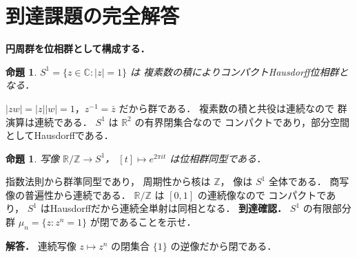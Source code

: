 \documentclass[a5paper,10pt,onecolumn]{jsarticle}
\makeatletter
\theoremstyle{mathnotetheorem}
\newtheorem{proposition}[theorem]{命題}
\renewcommand{\proofname}{証明}
\renewenvironment{proof}[1][\proofname]{%
  \par\pushQED{\qed}\normalfont\topsep4\p@\@plus2\p@\relax
  \trivlist\item[\hskip\labelsep\bfseries #1]\ignorespaces
}{\popQED\endtrivlist\@endpefalse}
\makeatother
\begin{document}
\section{到達課題の完全解答}
\noindent\textbf{円周群を位相群として構成する．}
\begin{proposition}
$S^1=\{z\in\mathbb C:|z|=1\}$ は
複素数の積によりコンパクトHausdorff位相群となる．
\end{proposition}
\begin{proof}
$|zw|=|z||w|=1$，$z^{-1}=\bar z$ だから群である．
複素数の積と共役は連続なので
群演算は連続である．
$S^1$ は $\mathbb R^2$ の有界閉集合なので
コンパクトであり，部分空間としてHausdorffである．
\end{proof}
\begin{proposition}
写像 $\mathbb R/\mathbb Z\to S^1$，
$[t]\mapsto e^{2\pi it}$ は位相群同型である．
\end{proposition}
\begin{proof}
指数法則から群準同型であり，
周期性から核は $\mathbb Z$，
像は $S^1$ 全体である．
商写像の普遍性から連続である．
$\mathbb R/\mathbb Z$ は $[0,1]$ の連続像なので
コンパクトであり，
$S^1$ はHausdorffだから連続全単射は同相となる．
\end{proof}
\noindent\textbf{到達確認．}
$S^1$ の有限部分群
$\mu_n=\{z:z^n=1\}$ が閉であることを示せ．
\par\noindent\textbf{解答．}
連続写像 $z\mapsto z^n$ の閉集合 $\{1\}$
の逆像だから閉である．
\end{document}
